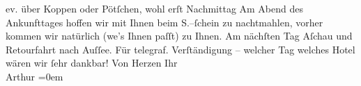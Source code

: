 \begin{ledgroupsized}[t]{13cm}
               ev. über Koppen oder Pötſchen, wohl erſt Nachmittag\pend
           \pstart
           Am Abend des Ankunfttages
               hoffen wir mit Ihnen beim S.–ſchein zu
               nachtmahlen, vorher kommen wir natürlich (we{\geminationn}’s Ihnen
               paſſt) zu Ihnen. Am nächſten Tag Aſchau und
               Retourfahrt nach Auſſee. Für telegraf. Verſtändigung
               – welcher Tag welches Hotel wären wir ſehr dankbar!\pend
           \pstart
           Von Herzen Ihr{\\[\baselineskip]}\spacefill\mbox{Arthur}\pend
           \leftskip=0em{}\endnumbering{}\end{ledgroupsized}  \newcommand{\dateiname}{L02237}\newcommand{\titel}{Arthur Schnitzler an Richard Beer-Hofmann, 20. 8. 1916}\newcommand{\editorInnen}{Martin Anton Müller und Gerd-Hermann Susen}
      